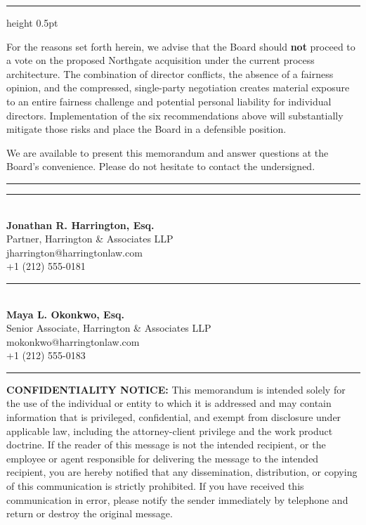 \documentclass[11pt,letterpaper]{article}
\newcommand{\sigline}[2]{%
  \vspace{18pt}
  \noindent\rule{6cm}{0.4pt}\\
  {\small\textbf{#1}}\\
  {\small\color{subtle}#2}%
}
\begin{document}
{\color{rule}\hrule height 0.5pt}\vspace{6pt}

For the reasons set forth herein, we advise that the Board should \textbf{not} proceed to a vote on the proposed Northgate acquisition under the current process architecture.  The combination of director conflicts, the absence of a fairness opinion, and the compressed, single-party negotiation creates material exposure to an entire fairness challenge and potential personal liability for individual directors.  Implementation of the six recommendations above will substantially mitigate those risks and place the Board in a defensible position.

We are available to present this memorandum and answer questions at the Board's convenience.  Please do not hesitate to contact the undersigned.

\vspace{16pt}

\noindent\rule{\linewidth}{0.4pt}

\vspace{6pt}

\noindent
\begin{minipage}[t]{0.46\linewidth}
  \sigline{Jonathan R. Harrington, Esq.}{Partner, Harrington \& Associates LLP\\
  \footnotesize jharrington@harringtonlaw.com\\
  \footnotesize +1 (212) 555-0181}
\end{minipage}\hspace{0.06\linewidth}%
\begin{minipage}[t]{0.46\linewidth}
  \sigline{Maya L. Okonkwo, Esq.}{Senior Associate, Harrington \& Associates LLP\\
  \footnotesize mokonkwo@harringtonlaw.com\\
  \footnotesize +1 (212) 555-0183}
\end{minipage}

\vspace{14pt}
\noindent\rule{\linewidth}{0.4pt}
\vspace{6pt}

{\footnotesize\color{subtle}
\textbf{CONFIDENTIALITY NOTICE:}  This memorandum is intended solely for the use of the individual or entity to which it is addressed and may contain information that is privileged, confidential, and exempt from disclosure under applicable law, including the attorney-client privilege and the work product doctrine.  If the reader of this message is not the intended recipient, or the employee or agent responsible for delivering the message to the intended recipient, you are hereby notified that any dissemination, distribution, or copying of this communication is strictly prohibited.  If you have received this communication in error, please notify the sender immediately by telephone and return or destroy the original message.
}
\end{document}
